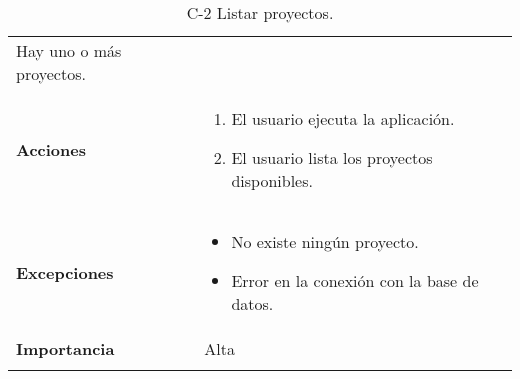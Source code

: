 \begin{longtable}[H]{@{}ll@{}}
\begin{minipage}[t]{0.71\columnwidth}
Hay uno o más proyectos.
\strut
\end{minipage}\tabularnewline
\begin{minipage}[t]{0.23\columnwidth}\raggedright\strut
\textbf{Acciones}\strut
\end{minipage} & \begin{minipage}[t]{0.71\columnwidth}\raggedright\strut
\begin{enumerate}
\def\labelenumi{\arabic{enumi}.}
\item
El usuario ejecuta la aplicación.
\item
El usuario lista los proyectos disponibles.
\end{enumerate}\strut
\end{minipage}\tabularnewline
\begin{minipage}[t]{0.23\columnwidth}\raggedright\strut
\textbf{Excepciones}\strut
\end{minipage} & \begin{minipage}[t]{0.71\columnwidth}\raggedright\strut
\begin{itemize}
\item
No existe ningún proyecto.
\item
Error en la conexión con la base de datos.
\end{itemize}\strut
\end{minipage}\tabularnewline
\begin{minipage}[t]{0.23\columnwidth}\raggedright\strut
\textbf{Importancia}\strut
\end{minipage} & \begin{minipage}[t]{0.71\columnwidth}\raggedright\strut
Alta\strut
\end{minipage}\tabularnewline
\bottomrule
\caption{C-2 Listar proyectos.}
\end{longtable}


